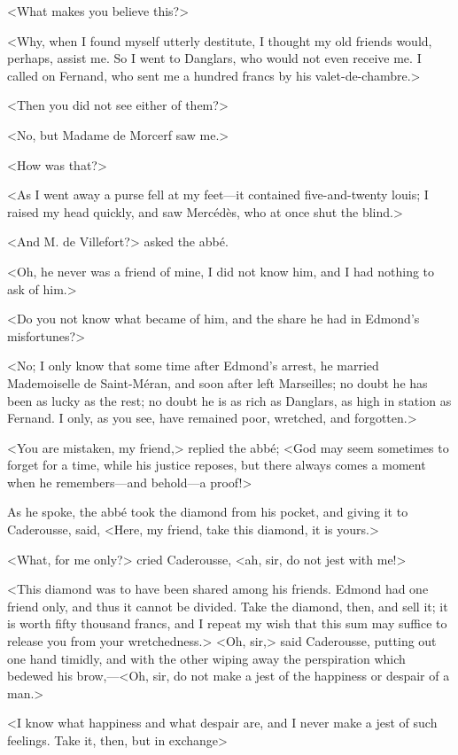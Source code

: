  <What makes you believe this?> 

 <Why, when I found myself utterly destitute, I thought my old friends would, perhaps, assist me. So I went to Danglars, who would not even receive me. I called on Fernand, who sent me a hundred francs by his valet-de-chambre.> 

 <Then you did not see either of them?> 

 <No, but Madame de Morcerf saw me.> 

 <How was that?> 

 <As I went away a purse fell at my feet—it contained five-and-twenty louis; I raised my head quickly, and saw Mercédès, who at once shut the blind.> 

 <And M. de Villefort?> asked the abbé. 

 <Oh, he never was a friend of mine, I did not know him, and I had nothing to ask of him.> 

 <Do you not know what became of him, and the share he had in Edmond's misfortunes?> 

 <No; I only know that some time after Edmond's arrest, he married Mademoiselle de Saint-Méran, and soon after left Marseilles; no doubt he has been as lucky as the rest; no doubt he is as rich as Danglars, as high in station as Fernand. I only, as you see, have remained poor, wretched, and forgotten.> 

 <You are mistaken, my friend,> replied the abbé; <God may seem sometimes to forget for a time, while his justice reposes, but there always comes a moment when he remembers—and behold—a proof!> 

 As he spoke, the abbé took the diamond from his pocket, and giving it to Caderousse, said, <Here, my friend, take this diamond, it is yours.> 

 <What, for me only?> cried Caderousse, <ah, sir, do not jest with me!> 

 <This diamond was to have been shared among his friends. Edmond had one friend only, and thus it cannot be divided. Take the diamond, then, and sell it; it is worth fifty thousand francs, and I repeat my wish that this sum may suffice to release you from your wretchedness.>  <Oh, sir,> said Caderousse, putting out one hand timidly, and with the other wiping away the perspiration which bedewed his brow,—<Oh, sir, do not make a jest of the happiness or despair of a man.> 

 <I know what happiness and what despair are, and I never make a jest of such feelings. Take it, then, but in exchange\longdash> 

